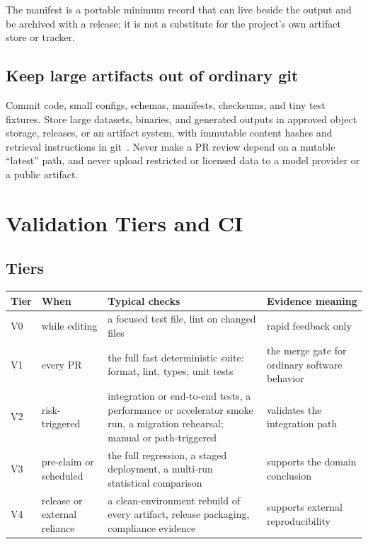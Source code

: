 \documentclass[11pt]{article}
\begin{document}
The manifest is a portable minimum record that can live beside the output and be archived with a
release; it is not a substitute for the project's own artifact store or tracker.

\subsection{Keep large artifacts out of ordinary git}

Commit code, small configs, schemas, manifests, checksums, and tiny test fixtures. Store large
datasets, binaries, and generated outputs in approved object storage, releases, or an artifact
system, with immutable content hashes and retrieval instructions in
git~\cite{github2026largefiles,github2026lfs}. Never make a PR review depend on a mutable
``latest'' path, and never upload restricted or licensed data to a model provider or a public
artifact.

\section{Validation Tiers and CI}

\subsection{Tiers}

\begin{center}
\begin{tabularx}{\textwidth}{@{}l Y Y Y@{}}
\toprule
\textbf{Tier} & \textbf{When} & \textbf{Typical checks} & \textbf{Evidence meaning} \\
\midrule
V0 & while editing & a focused test file, lint on changed files & rapid feedback only \\
V1 & every PR & the full fast deterministic suite: format, lint, types, unit tests & the merge
  gate for ordinary software behavior \\
V2 & risk-triggered & integration or end-to-end tests, a performance or accelerator smoke run,
  a migration rehearsal; manual or path-triggered & validates the integration path \\
V3 & pre-claim or scheduled & the full regression, a staged deployment, a multi-run
  statistical comparison & supports the domain conclusion \\
V4 & release or external reliance & a clean-environment rebuild of every artifact, release
  packaging, compliance evidence & supports external reproducibility \\
\bottomrule
\end{tabularx}
\end{center}
\end{document}
